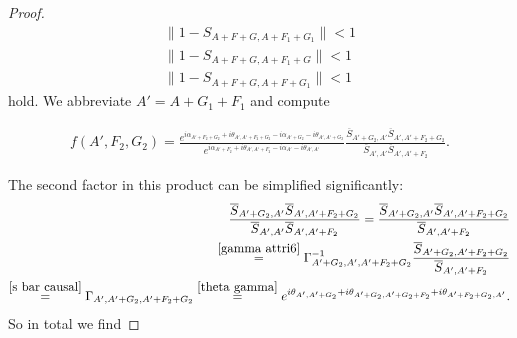 \documentclass[a4paper,11pt]{article}
\begin{document}
\begin{proof}
 \begin{align}
 \|1-S_{A+F+G,A+F_1+G_1}\|<1\\
 \|1-S_{A+F+G,A+F_1+G}\|<1\\
 \|1-S_{A+F+G,A+F+G_1}\|<1
 \end{align} 
 hold. We abbreviate \(A'=A+G_1+F_1\) and compute
 
 \begin{align}
 f(A',F_2,G_2)=\frac{e^{i\alpha_{A'+F_2+G_2}+i\theta_{A',A'+F_2+G_2}-i\alpha_{A'+G_2}-i\theta_{A',A'+G_2}}}{e^{i\alpha_{A'+F_2}+i\theta_{A',A'+F_2}-i\alpha_{A'}-i\theta_{A',A'}}} 
 \frac{\overline{S}_{A'+G_2,A'}\overline{S}_{A',A'+F_2+G_2}}{\overline{S}_{A',A'}\overline{S}_{A',A'+F_2}}.
 \end{align}

The second factor in this product can be simplified significantly:
\begin{align}
 \frac{\overline{S}_{A'+G_2,A'}\overline{S}_{A',A'+F_2+G_2}}{\overline{S}_{A',A'}\overline{S}_{A',A'+F_2}}
 = \frac{\overline{S}_{A'+G_2,A'}\overline{S}_{A',A'+F_2+G_2}}{\overline{S}_{A',A'+F_2}}\\
 \overset{\eqref{gamma attri6}}{=}\Gamma^{-1}_{A'+G_2,A',A'+F_2+G_2}\frac{\overline{S}_{A'+G_2,A'+F_2+G_2}}{\overline{S}_{A',A'+F_2}}\\
 \overset{\eqref{s bar causal}}{=}\Gamma_{A',A'+G_2,A'+F_2+G_2}
\overset{ \eqref{theta gamma}}{=}e^{i\theta_{A',A'+G_2}+i\theta_{A'+G_2,A'+G_2+F_2}+i\theta_{A'+F_2+G_2,A'}}.
\end{align}
So in total we find


\end{proof}
\end{document}
